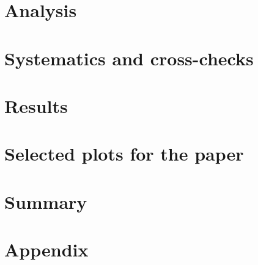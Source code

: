 \documentclass[english]{atlasnote}
\begin{document}
\section{Analysis}
\label{sec:ana}

\clearpage

\section{Systematics and cross-checks}
\label{sec:sys}

\clearpage

\section{Results}
\label{sec:result}

\clearpage

\section{Selected plots for the paper}
\label{sec:paper}

\clearpage

\section{Summary}
\label{sec:summary}

\clearpage

\section{Appendix}
\label{sec:appendix}

\clearpage



\end{document}
